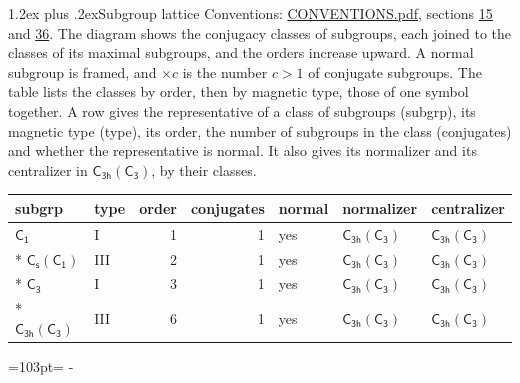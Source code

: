 \documentclass[10pt,a4paper]{article}
\makeatletter
\renewcommand\section{\@startsection{section}{1}{\z@}{-3ex plus -1ex minus -.2ex}%
  {1.2ex plus .2ex}{\normalfont\large\sffamily\bfseries\color{parttitle}}}
\newcommand{\needspace}[1]{\par\penalty-100\begingroup\dimen0=#1\relax\dimen2=\pagegoal
  \advance\dimen2-\pagetotal\ifdim\dimen0>\dimen2\relax\ifdim\dimen2>0pt\vfil\break\fi\fi
  \endgroup}
\numberwithin{equation}{section}
\newcommand{\grp}[1]{\mathsf{#1}}
\makeatother
\begin{document}
\section{Subgroup lattice}\label{s:subgroups}
Conventions: \href{../../CONVENTIONS.pdf}{CONVENTIONS.pdf}, sections \href{../../../rotation/CONVENTIONS.pdf\#conv.15}{15} and \href{../../CONVENTIONS.pdf\#conv.36}{36}.
The diagram shows the conjugacy classes of subgroups, each joined to the classes of its maximal subgroups, and the orders increase upward. \label{n:index.conjugates.c}A normal subgroup is framed, and ${\times}c$ is the number $c > 1$ of conjugate subgroups. The table lists the classes by order, then by magnetic type, those of one symbol together. \label{n:head.subgroup}\label{n:head.magnetic.type}\label{n:head.order}\label{n:head.conjugates}\label{n:head.normal}A row gives the representative of a class of subgroups (subgrp), its magnetic type (type), its order, the number of subgroups in the class (conjugates) and whether the representative is normal. \label{n:head.normalizer}\label{n:head.centralizer}It also gives its normalizer and its centralizer in $\grp{C_{3h}}(\grp{C_{3}})$, by their classes. 
\begin{center}
\end{center}
{\small\begin{longtable}{@{}llrrlll@{}}\toprule
subgrp & type & order & conjugates & normal & normalizer & centralizer\\\midrule\endhead
\bottomrule\endfoot\endlastfoot
\href{../../../rotation/data/pdf/C1.pdf}{$\grp{C_{1}}$} & I & 1 & 1 & yes & \href{C3h-C3.pdf}{$\grp{C_{3h}}(\grp{C_{3}})$} & \href{C3h-C3.pdf}{$\grp{C_{3h}}(\grp{C_{3}})$}\\*
\href{C1v-C1.pdf}{$\grp{C_{s}}(\grp{C_{1}})$} & III & 2 & 1 & yes & \href{C3h-C3.pdf}{$\grp{C_{3h}}(\grp{C_{3}})$} & \href{C3h-C3.pdf}{$\grp{C_{3h}}(\grp{C_{3}})$}\\*
\href{../../../rotation/data/pdf/C3.pdf}{$\grp{C_{3}}$} & I & 3 & 1 & yes & \href{C3h-C3.pdf}{$\grp{C_{3h}}(\grp{C_{3}})$} & \href{C3h-C3.pdf}{$\grp{C_{3h}}(\grp{C_{3}})$}\\*
\href{C3h-C3.pdf}{$\grp{C_{3h}}(\grp{C_{3}})$} & III & 6 & 1 & yes & \href{C3h-C3.pdf}{$\grp{C_{3h}}(\grp{C_{3}})$} & \href{C3h-C3.pdf}{$\grp{C_{3h}}(\grp{C_{3}})$}\\
\bottomrule\end{longtable}}
\needspace{103pt}
\end{document}
